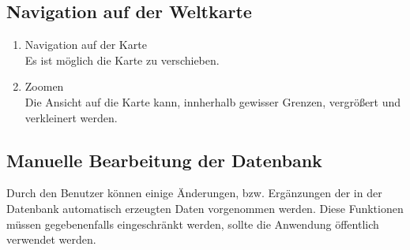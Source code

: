 \subsection{Navigation auf der Weltkarte}
\begin{enumerate}[ align=left, label={\textbf{\textbackslash F30\arabic*0\textbackslash}} ]
	\item Navigation auf der Karte \label{:PF_Navigation} \\
	Es ist möglich die Karte zu verschieben.
	\item Zoomen \label{:PF_Zoomen} \\
	Die Ansicht auf die Karte kann, innherhalb gewisser Grenzen, vergrößert und verkleinert werden.
\end{enumerate}	
\subsection{Manuelle Bearbeitung der Datenbank}
Durch den Benutzer können einige Änderungen, bzw. Ergänzungen der in der Datenbank automatisch erzeugten Daten vorgenommen werden. Diese Funktionen müssen gegebenenfalls eingeschränkt werden, sollte die Anwendung öffentlich verwendet werden.
